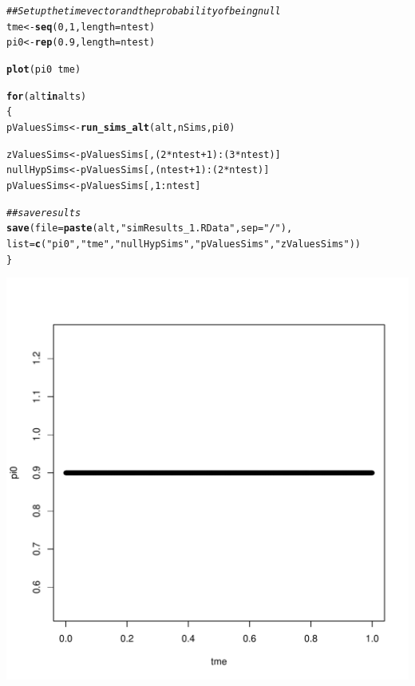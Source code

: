 \documentclass{article}\usepackage[]{graphicx}\usepackage[]{color}
\makeatletter
\def\maxwidth{ %
  \ifdim\Gin@nat@width>\linewidth
    \linewidth
  \else
    \Gin@nat@width
  \fi
}
\newcommand{\hlnum}[1]{\textcolor[rgb]{0.686,0.059,0.569}{#1}}%
\newcommand{\hlstr}[1]{\textcolor[rgb]{0.192,0.494,0.8}{#1}}%
\newcommand{\hlcom}[1]{\textcolor[rgb]{0.678,0.584,0.686}{\textit{#1}}}%
\newcommand{\hlopt}[1]{\textcolor[rgb]{0,0,0}{#1}}%
\newcommand{\hlstd}[1]{\textcolor[rgb]{0.345,0.345,0.345}{#1}}%
\newcommand{\hlkwa}[1]{\textcolor[rgb]{0.161,0.373,0.58}{\textbf{#1}}}%
\newcommand{\hlkwb}[1]{\textcolor[rgb]{0.69,0.353,0.396}{#1}}%
\newcommand{\hlkwc}[1]{\textcolor[rgb]{0.333,0.667,0.333}{#1}}%
\newcommand{\hlkwd}[1]{\textcolor[rgb]{0.737,0.353,0.396}{\textbf{#1}}}%
\newenvironment{kframe}{%
 \def\at@end@of@kframe{}%
 \ifinner\ifhmode%
  \def\at@end@of@kframe{\end{minipage}}%
  \begin{minipage}{\columnwidth}%
 \fi\fi%
 \def\FrameCommand##1{\hskip\@totalleftmargin \hskip-\fboxsep
 \colorbox{shadecolor}{##1}\hskip-\fboxsep
     \hskip-\linewidth \hskip-\@totalleftmargin \hskip\columnwidth}%
 \MakeFramed {\advance\hsize-\width
   \@totalleftmargin\z@ \linewidth\hsize
   \@setminipage}}%
 {\par\unskip\endMakeFramed%
 \at@end@of@kframe}
\newenvironment{knitrout}{}{} %
\makeatother
\begin{document}
\begin{knitrout}
\color{fgcolor}\begin{kframe}
\begin{alltt}
\hlcom{## Set up the time vector and the probability of being null}
\hlstd{tme} \hlkwb{<-} \hlkwd{seq}\hlstd{(}\hlnum{0}\hlstd{,}\hlnum{1}\hlstd{,} \hlkwc{length}\hlstd{=ntest)}
\hlstd{pi0} \hlkwb{<-} \hlkwd{rep}\hlstd{(}\hlnum{0.9}\hlstd{,} \hlkwc{length}\hlstd{=ntest)}

\hlkwd{plot}\hlstd{(pi0} \hlopt{~} \hlstd{tme)}

\hlkwa{for}\hlstd{(alt} \hlkwa{in} \hlstd{alts)}
\hlstd{\{}
  \hlstd{pValuesSims} \hlkwb{<-} \hlkwd{run_sims_alt}\hlstd{(alt, nSims, pi0)}

  \hlstd{zValuesSims} \hlkwb{<-} \hlstd{pValuesSims[,(}\hlnum{2}\hlopt{*}\hlstd{ntest}\hlopt{+}\hlnum{1}\hlstd{)}\hlopt{:}\hlstd{(}\hlnum{3}\hlopt{*}\hlstd{ntest)]}
  \hlstd{nullHypSims} \hlkwb{<-} \hlstd{pValuesSims[,(ntest}\hlopt{+}\hlnum{1}\hlstd{)}\hlopt{:}\hlstd{(}\hlnum{2}\hlopt{*}\hlstd{ntest)]}
  \hlstd{pValuesSims} \hlkwb{<-} \hlstd{pValuesSims[,}\hlnum{1}\hlopt{:}\hlstd{ntest]}

  \hlcom{##save results}
  \hlkwd{save}\hlstd{(}\hlkwc{file}\hlstd{=}\hlkwd{paste}\hlstd{(alt,} \hlstr{"simResults_1.RData"}\hlstd{,}\hlkwc{sep}\hlstd{=}\hlstr{"/"}\hlstd{),}
       \hlkwc{list}\hlstd{=}\hlkwd{c}\hlstd{(}\hlstr{"pi0"}\hlstd{,} \hlstr{"tme"}\hlstd{,} \hlstr{"nullHypSims"}\hlstd{,}\hlstr{"pValuesSims"}\hlstd{,}\hlstr{"zValuesSims"}\hlstd{))}
\hlstd{\}}
\end{alltt}
\end{kframe}

{\centering \includegraphics[width=\maxwidth]{Figures/I-1} 

}



\end{knitrout}
\end{document}
